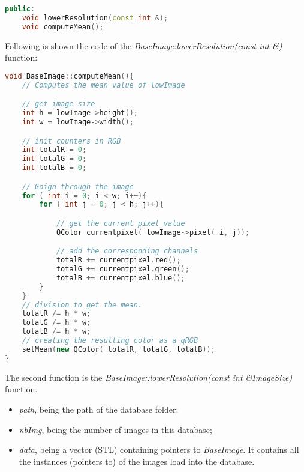 \documentclass[aps,letterpaper,11pt]{revtex4}
\begin{document}
\begin{lstlisting}[language=C++]
public:
    void lowerResolution(const int &);
    void computeMean();
\end{lstlisting}

Following is shown the code of the \textit{BaseImage:lowerResolution(const int \&)} function:
 
\begin{lstlisting}[language=C++]
void BaseImage::computeMean(){
    // Computes the mean value of lowImage

    // get image size
    int h = lowImage->height();
    int w = lowImage->width();

    // init counters in RGB
    int totalR = 0;
    int totalG = 0;
    int totalB = 0;

    // Goign through the image
    for ( int i = 0; i < w; i++){
        for ( int j = 0; j < h; j++){

            // get the current pixel value
            QColor currentpixel( lowImage->pixel( i, j));

            // add the corresponding channels
            totalR += currentpixel.red();
            totalG += currentpixel.green();
            totalB += currentpixel.blue();
        }
    }
    // division to get the mean.
    totalR /= h * w;
    totalG /= h * w;
    totalB /= h * w;
    // creating the resulting color as a qRGB
    setMean(new QColor( totalR, totalG, totalB));
}
\end{lstlisting}
The second function is the \textit{BaseImage::lowerResolution(const int \&ImageSize)} function.
 
\begin{itemize}
  \item \textit{path}, being the path of the database folder;
  \item \textit{nbImg}, being the number of images in this database;
  \item\textit{data}, being a vector (STL) containing pointers to \textit{BaseImage}. It contains all the instances (pointers to) of the images load into the database.
\end{itemize}
\end{document}
